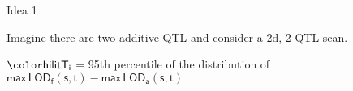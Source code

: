 \documentclass[aspectratio=169,12pt,t]{beamer}
\newcommand{\lod}{\text{LOD}}
\begin{document}
\begin{frame}{Idea 1}


\hfill \begin{minipage}{10in}

Imagine there are two additive QTL and consider a 2d, 2-QTL scan.

\vspace{1cm}

\hspace*{0.5in} $\mathsf{\hilit T_i}$ = 95th percentile of the
  distribution of \\[6pt]
\hspace*{1.3in} {\lolit $\mathsf{ \text{max} \, \lod_f(s,t) -
    \text{max} \, \lod_a(s,t)}$}




\end{minipage}

\note{
}
\end{frame}
\end{document}
